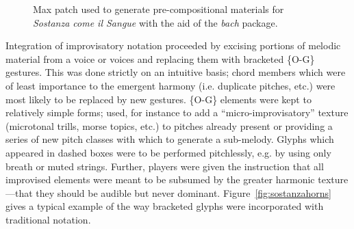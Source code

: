         \begin{figure}
            \centering
            \captionsetup{width=.5\textwidth}
            \caption{Max patch used to generate pre-compositional materials for \textit{Sostanza come il Sangue} with the aid of the \textit{bach} package.}
            \label{fig:sostanzapatch}
        \end{figure}

    Integration of improvisatory notation proceeded by excising portions of melodic material from a voice or voices and replacing them with bracketed \{O-G\} gestures. This was done strictly on an intuitive basis; chord members which were of least importance to the emergent harmony (i.e. duplicate pitches, etc.) were most likely to be replaced by new gestures. \{O-G\} elements were kept to relatively simple forms; used, for instance to add a ``micro-improvisatory'' texture (microtonal trills, morse topics, etc.) to pitches already present or providing a series of new pitch classes with which to generate a sub-melody. Glyphs which appeared in dashed boxes were to be performed pitchlessly, e.g. by using only breath or muted strings. Further, players were given the instruction that all improvised elements were meant to be subsumed by the greater harmonic texture---that they should be audible but never dominant. Figure~\ref{fig:sostanzahorns} gives a typical example of the way bracketed glyphs were incorporated with traditional notation.

